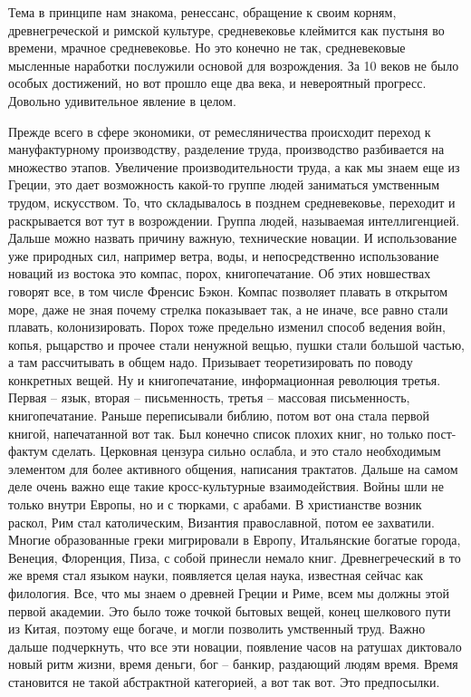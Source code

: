 \documentclass[a4paper, 12pt]{article}
\begin{document}
Тема в принципе нам знакома, ренессанс, обращение к своим корням, 
древнегреческой и римской культуре, средневековье клеймится как пустыня 
во времени, мрачное средневековье. Но это конечно не так, средневековые 
мысленные наработки послужили основой для возрождения. За 10 веков не 
было особых достижений, но вот прошло еще два века, и невероятный 
прогресс. Довольно удивительное явление в целом.

Прежде всего в сфере экономики, от ремесляничества происходит переход 
к мануфактурному производству, разделение труда, производство 
разбивается на множество этапов. Увеличение производительности труда, 
а как мы знаем еще из Греции, это дает возможность какой-то группе людей 
заниматься умственным трудом, искусством. То, что складывалось в позднем 
средневековье, переходит и раскрывается вот тут в возрождении. Группа 
людей, называемая интеллигенцией. Дальше можно назвать причину важную, 
технические новации. И использование уже природных сил, например ветра, 
воды, и непосредственно использование новаций из востока это компас, 
порох, книгопечатание. Об этих новшествах говорят все, в том числе 
Френсис Бэкон. Компас позволяет плавать в открытом море, даже не зная 
почему стрелка показывает так, а не иначе, все равно стали плавать, 
колонизировать. Порох тоже предельно изменил способ ведения войн, копья, 
рыцарство и прочее стали ненужной вещью, пушки стали большой частью, 
а там рассчитывать в общем надо. Призывает теоретизировать по поводу 
конкретных вещей. Ну и книгопечатание, информационная революция третья. 
Первая -- язык, вторая -- письменность, третья -- массовая письменность, 
книгопечатание. Раньше переписывали библию, потом вот она стала первой 
книгой, напечатанной вот так. Был конечно список плохих книг, но только 
пост-фактум сделать. Церковная цензура сильно ослабла, и это стало 
необходимым элементом для более активного общения, написания трактатов. 
Дальше на самом деле очень важно еще такие кросс-культурные 
взаимодействия. Войны шли не только внутри Европы, но и с тюрками, 
с арабами. В христианстве возник раскол, Рим стал католическим, Византия 
православной, потом ее захватили. Многие образованные греки мигрировали 
в Европу, Итальянские богатые города, Венеция, Флоренция, Пиза, с собой 
принесли немало книг. Древнегреческий в то же время стал языком науки, 
появляется целая наука, известная сейчас как филология. Все, что мы 
знаем о древней Греции и Риме, всем мы должны этой первой академии. Это 
было тоже точкой бытовых вещей, конец шелкового пути из Китая, поэтому 
еще богаче, и могли позволить умственный труд. Важно дальше подчеркнуть, 
что все эти новации, появление часов на ратушах диктовало новый ритм 
жизни, время деньги, бог -- банкир, раздающий людям время. Время 
становится не такой абстрактной категорией, а вот так вот. Это 
предпосылки.
\end{document}
